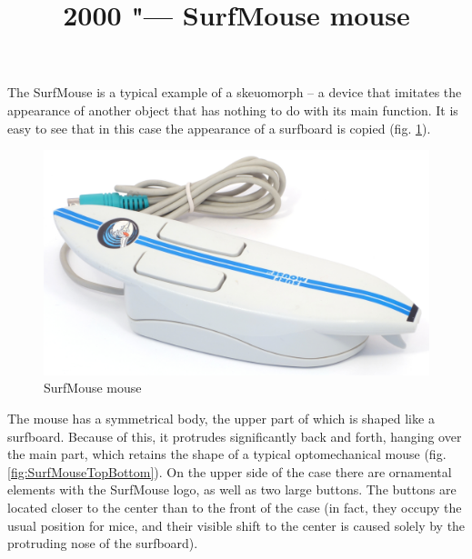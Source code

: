 \documentclass[11pt, a4paper]{article}
\begin{document}
\title{2000 "--- SurfMouse mouse}
\date{}
\maketitle
{}
The SurfMouse is a typical example of a skeuomorph -- a device that imitates the appearance of another object that has nothing to do with its main function. It is easy to see that in this case the appearance of a surfboard is copied (fig. \ref{fig:SurfMousePic}).

\begin{figure}[h]
    \centering
    \includegraphics[scale=0.4]{2000_surf_mouse/pic_60.jpg}
    \caption{SurfMouse mouse}
    \label{fig:SurfMousePic}
\end{figure}

The mouse has a symmetrical body, the upper part of which is shaped like a surfboard. Because of this, it protrudes significantly back and forth, hanging over the main part, which retains the shape of a typical optomechanical mouse (fig. \ref{fig:SurfMouseTopBottom}). On the upper side of the case there are ornamental elements with the SurfMouse logo, as well as two large buttons. The buttons are located closer to the center than to the front of the case (in fact, they occupy the usual position for mice, and their visible shift to the center is caused solely by the protruding nose of the surfboard).
\end{document}
